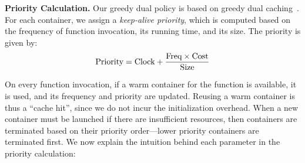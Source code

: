 %
%
%
%

%






\noindent \textbf{Priority Calculation.} 
Our greedy dual policy is based on greedy dual caching~\cite{gdsf}. 
%
For each container, we assign a \emph{keep-alive priority}, which is computed based on the frequency of function invocation, its running time, and its size. 
%
The priority is given by:   \vspace*{-7pt}
\begin{equation}
  \vspace*{-7pt}
  \text{Priority} = \text{Clock} + \frac{\text{Freq} \times \text{Cost}} {\text{Size}}
    \label{eq:prio-prop}
\end{equation}
%
% 

On every function invocation, if a warm container for the function is available, it is used, and its frequency and priority are updated.
Reusing a warm container is thus a ``cache hit'', since we do not incur the initialization overhead. 
%
When a new container must be launched if there are insufficient resources, then containers are terminated based on their priority order---lower priority containers are terminated first. 
%
We now explain the intuition behind each parameter in the priority calculation:



